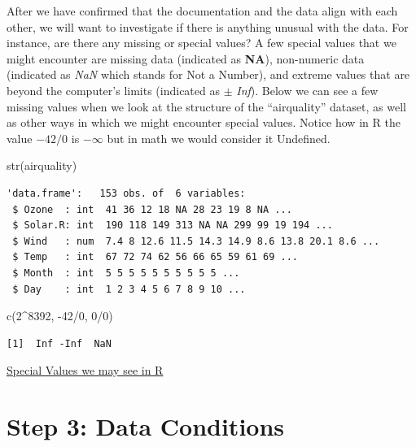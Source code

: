 \documentclass[
  letterpaper,
  DIV=11,
  numbers=noendperiod]{scrreprt}
\newenvironment{Shaded}{\begin{snugshade}}{\end{snugshade}}
\newcommand{\DecValTok}[1]{\textcolor[rgb]{0.68,0.00,0.00}{#1}}
\newcommand{\FunctionTok}[1]{\textcolor[rgb]{0.28,0.35,0.67}{#1}}
\newcommand{\NormalTok}[1]{\textcolor[rgb]{0.00,0.23,0.31}{#1}}
\newcommand{\SpecialCharTok}[1]{\textcolor[rgb]{0.37,0.37,0.37}{#1}}
\begin{document}
After we have confirmed that the documentation and the data align with
each other, we will want to investigate if there is anything unusual
with the data. For instance, are there any missing or special values? A
few special values that we might encounter are missing data (indicated
as \textbf{NA}), non-numeric data (indicated as \emph{NaN} which stands
for Not a Number), and extreme values that are beyond the computer's
limits (indicated as \(\pm\) \emph{Inf}). Below we can see a few missing
values when we look at the structure of the ``airquality'' dataset, as
well as other ways in which we might encounter special values. Notice
how in R the value \(-42/0\) is \(-\infty\) but in math we would
consider it Undefined.

\begin{Shaded}
\begin{Highlighting}[]
\FunctionTok{str}\NormalTok{(airquality)}
\end{Highlighting}
\end{Shaded}

\begin{verbatim}
'data.frame':   153 obs. of  6 variables:
 $ Ozone  : int  41 36 12 18 NA 28 23 19 8 NA ...
 $ Solar.R: int  190 118 149 313 NA NA 299 99 19 194 ...
 $ Wind   : num  7.4 8 12.6 11.5 14.3 14.9 8.6 13.8 20.1 8.6 ...
 $ Temp   : int  67 72 74 62 56 66 65 59 61 69 ...
 $ Month  : int  5 5 5 5 5 5 5 5 5 5 ...
 $ Day    : int  1 2 3 4 5 6 7 8 9 10 ...
\end{verbatim}

\begin{Shaded}
\begin{Highlighting}[]
\FunctionTok{c}\NormalTok{(}\DecValTok{2}\SpecialCharTok{\^{}}\DecValTok{8392}\NormalTok{, }\SpecialCharTok{{-}}\DecValTok{42}\SpecialCharTok{/}\DecValTok{0}\NormalTok{, }\DecValTok{0}\SpecialCharTok{/}\DecValTok{0}\NormalTok{)}
\end{Highlighting}
\end{Shaded}

\begin{verbatim}
[1]  Inf -Inf  NaN
\end{verbatim}

\begin{watch}{}{}
    \href{https://youtu.be/nkYpKiHXc0o}{Special Values we may see in R}
\end{watch}

\section{Step 3: Data Conditions}\label{step-3-data-conditions}
\end{document}
